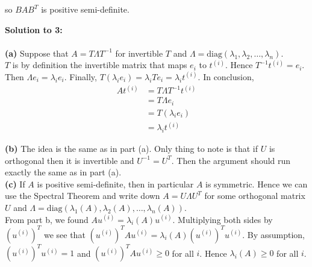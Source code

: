\documentclass{article}
\begin{document}
so $BAB^T$ is positive semi-definite.

\clearpage

\textbf{Solution to 3:}
\\
\\
\textbf{(a)} Suppose that $A=T \Lambda T^{-1}$ for invertible $T$ and $\Lambda = \text{diag}(\lambda_1,
\lambda_2, \dots, \lambda_n)$.\\

$T$ is by definition the invertible matrix that maps $e_i$ to $t^{(i)}$. Hence $T^{-1}t^{(i)}=e_i$. Then
$\Lambda e_i = \lambda_i e_i$. Finally, $T (\lambda_i e_i) = \lambda_i T e_i = \lambda_i t^{(i)}$.
In conclusion,
\begin{align*}
At^{(i)} &= T \Lambda T^{-1} t^{(i)} \\
&= T \Lambda e_i \\
&= T (\lambda_i e_i) \\
&= \lambda_i t^{(i)}
\end{align*}

\textbf{(b)} The idea is the same as in part (a). Only thing to note is that if $U$ is orthogonal
then it is invertible and $U^{-1} = U^T$. Then the argument should run exactly the same as in part (a).\\

\textbf{(c)} If $A$ is positive semi-definite, then in particular $A$ is symmetric. Hence 
we can use the Spectral Theorem and write down $A = U \Lambda U^T$ for some orthogonal matrix $U$ and
$\Lambda = \text{diag}(\lambda_1(A), \lambda_2(A), \dots, \lambda_n(A))$.\\

From part b, we found $Au^{(i)} = \lambda_i(A)u^{(i)}$. Multiplying both sides by $(u^{(i)})^T$ we see that
$(u^{(i)})^T A u^{(i)} = \lambda_i(A)(u^{(i)})^T u^{(i)}$. By assumption, $(u^{(i)})^T u^{(i)} = 1$ 
and $(u^{(i)})^T A u^{(i)} \geq 0$ for all $i$. Hence $\lambda_i(A) \geq 0$ for all $i$.
\end{document}
